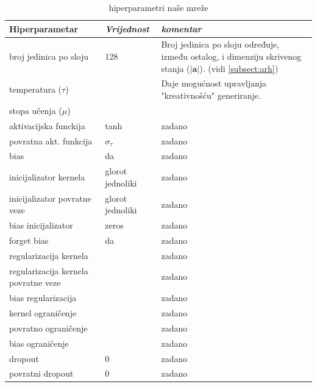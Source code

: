 \documentclass[conference]{IEEEtran}
\begin{document}
\begin{table}[htbp]
\caption{hiperparametri naše mreže}
\begin{center}
\begin{tabular}{|p{120pt}|p{40pt}|p{60pt}|}
\hline
\textbf{Hiperparametar} & \textbf{\textit{Vrijednost}} & \textbf{\textit{komentar}}\\ \hline
broj jedinica po sloju & 128 & Broj jedinica po sloju određuje, između ostalog, i dimenziju skrivenog stanja ($\lvert \mathbf{a} \rvert$). (vidi \ref{subsect:arh})\\ \hline
temperatura ($\tau$) &  & Daje mogućnost upravljanja "kreativnošću" generiranje. \\ \hline
stopa učenja ($\mu$) &  & \\ \hline \hline
aktivacijska funckija & tanh & zadano \\ \hline
povratna akt. funkcija & $\sigma_{\tau}$ & zadano \\ \hline
bias & da & zadano \\ \hline
inicijalizator kernela & glorot jednoliki & zadano \\ \hline
inicijalizator povratne veze & glorot jednoliki & zadano \\ \hline
bias inicijalizator & zeros & zadano \\ \hline
forget bias & da & zadano \\ \hline
regularizacija kernela & & zadano \\ \hline
regularizacija kernela povratne veze &  & zadano \\ \hline
bias regularizacija &  & zadano \\ \hline
kernel ograničenje &  & zadano \\ \hline
povratno ograničenje &  & zadano \\ \hline
bias ograničenje & & zadano\\ \hline
dropout & 0 & zadano \\ \hline
povratni dropout & 0 & zadano \\ \hline
\end{tabular}
\label{tab:hiper}
\end{center}
\end{table}
\end{document}
